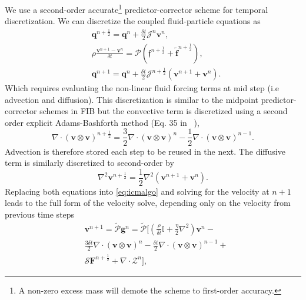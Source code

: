 \documentclass[twoside,openright,titlepage,numbers=noenddot,%
headinclude,footinclude,cleardoublepage=empty,abstract=on,
BCOR=5mm,fontsize=11pt, dvipsnames, paper=b5
]{scrreprt}
\renewcommand{\vec}[1]{\bm{#1}}
\newcommand{\oper}[1]{\mathcal{#1}}
\newcommand{\dt}{\delta t}
\newcommand{\half}{\frac{1}{2}}
\newcommand{\ppos}{q}
\newcommand{\fvel}{v}
\begin{document}
We use a second-order accurate\footnote{A non-zero excess mass will demote the scheme to first-order accuracy.} predictor-corrector scheme for temporal discretization. We can discretize the coupled fluid-particle equations as
\begin{equation}
  \label{eq:icmalgo}
  \begin{aligned}
    &\vec{\ppos}^{n+\half} = \vec{\ppos}^n + \frac{\dt}{2}\oper{J}^n\vec{\fvel}^n,\\
    &\rho\frac{\vec{\fvel}^{n+1} - \vec{\fvel}^n}{\dt} = \oper{P}\left(\vec{\mathfrak{f}}^{n+\half} + \tilde{\vec{f}}^{n+\half} \right),\\
    &\vec{\ppos}^{n+1} = \vec{\ppos}^n + \frac{\dt}{2}\oper{J}^{n+\half}\left(\vec{\fvel}^{n+1} + \vec{\fvel}^{n}\right).
  \end{aligned}
\end{equation}
Which requires evaluating the non-linear fluid forcing terms at mid step (i.e advection and diffusion).
This discretization is similar to the midpoint predictor-corrector schemes in \gls{FIB} but the convective term is discretized using a second order explicit Adams-Bashforth method (Eq. 35 in ~\cite{Balboa2014}),
\begin{equation}
  \nabla\cdot (\vec{\fvel}\otimes\vec{\fvel})^{n+\half} = \frac{3}{2} \nabla\cdot (\vec{\fvel}\otimes\vec{\fvel})^n - \half \nabla\cdot (\vec{\fvel}\otimes\vec{\fvel})^{n-1}.
\end{equation}
Advection is therefore stored each step to be reused in the next.
The diffusive term is similarly discretized to second-order by
\begin{equation}
  \nabla^2\vec{\fvel}^{n+\half} = \half\nabla^2\left(\vec{\fvel}^{n+1} + \vec{\fvel}^{n}\right).
\end{equation}
Replacing both equations into \eqref{eq:icmalgo} and solving for the velocity at $n+1$ leads to the full form of the velocity solve, depending only on the velocity from previous time steps
\begin{equation}
  \label{eq:icmfluidvel}
  \begin{aligned}
    &\vec{\fvel}^{n+1} = \tilde{\oper{P}}\vec{g}^n =\tilde{\oper{P}}\Big[    \left(\frac{\rho}{\dt}\mathbb{I} + \frac{\eta}{2}\nabla^2\right)\vec{\fvel}^n- \\
    & \frac{3\dt}{2} \nabla\cdot (\vec{\fvel}\otimes\vec{\fvel})^n - \frac{\dt}{2} \nabla\cdot (\vec{\fvel}\otimes\vec{\fvel})^{n-1}+\\
    &\oper{S}\vec{F}^{n+\half} + \nabla\cdot\mathcal{Z}^n \Big],
  \end{aligned}
\end{equation}
\end{document}
